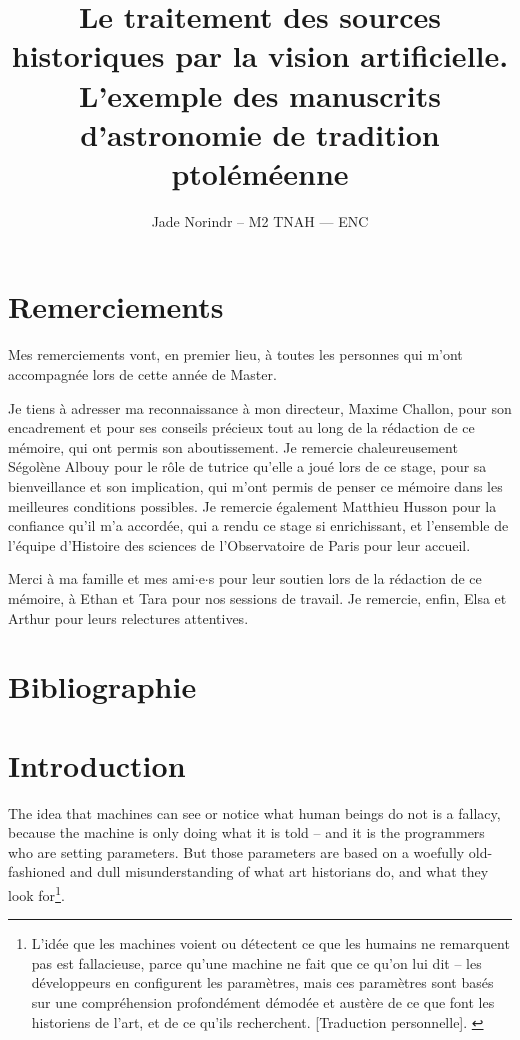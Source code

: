 \documentclass[a4paper,12pt,twoside]{book}
\author{Jade Norindr – M2 TNAH — ENC}
\title{Le traitement des sources historiques par la vision artificielle. L'exemple des manuscrits d'astronomie de tradition ptoléméenne}
\newcommand{\clearemptydoublepage}{\newpage{\pagestyle{empty}\cleardoublepage}}
\newcommand\chapterNo[1]{
  \chapter*{#1}
  \markright{\MakeUppercase{#1}}
}
\begin{document}
\onehalfspacing
\frontmatter

    

    \thispagestyle{empty}	
    \cleardoublepage
	
    
	
    \chapterNo{Remerciements}
    
    Mes remerciements vont, en premier lieu, à toutes les personnes qui m'ont accompagnée lors de cette année de Master.
    
    Je tiens à adresser ma reconnaissance à mon directeur, Maxime Challon, pour son encadrement et pour ses conseils précieux tout au long de la rédaction de ce mémoire, qui ont permis son aboutissement. Je remercie chaleureusement Ségolène Albouy pour le rôle de tutrice qu'elle a joué lors de ce stage, pour sa bienveillance et son implication, qui m'ont permis de penser ce mémoire dans les meilleures conditions possibles. Je remercie également Matthieu Husson pour la confiance qu'il m'a accordée, qui a rendu ce stage si enrichissant, et l'ensemble de l'équipe d'Histoire des sciences de l'Observatoire de Paris pour leur accueil.
    
    Merci à ma famille et mes ami$\cdot$e$\cdot$s pour leur soutien lors de la rédaction de ce mémoire, à Ethan et Tara pour nos sessions de travail. Je remercie, enfin, Elsa et Arthur pour leurs relectures attentives.
	
	\chapterNo{Bibliographie}	
    \printbibliography[keyword={DH},title={Humanités numériques}]
    \clearemptydoublepage
    \printbibliography[keyword={ml},title={\textit{Machine learning}, \textit{deep learning} et vision artificielle}]
    \clearemptydoublepage
    \printbibliography[keyword={technique},title={Documentation technique et méthode}]
    \clearemptydoublepage
    \printbibliography[keyword={astronomie},title={Histoire de l'astronomie}]
    \clearemptydoublepage
    
    \chapterNo{Introduction}
    \begin{displayquote}
    	The idea that machines can see or notice what human beings do not is a fallacy, because the machine is only doing what it is told – and it is the programmers who are setting parameters. But those parameters are based on a woefully old-fashioned and dull misunderstanding of what art historians do, and what they look for\footnote{\og L'idée que les machines voient ou détectent ce que les humains ne remarquent pas est fallacieuse, parce qu'une machine ne fait que ce qu'on lui dit -- les développeurs en configurent les paramètres, mais ces paramètres sont basés sur une compréhension profondément démodée et austère de ce que font les historiens de l'art, et de ce qu'ils recherchent. [Traduction personnelle]\fg. \cite{pollockComputersCanFind2014}}.
    \end{displayquote}
\end{document}
